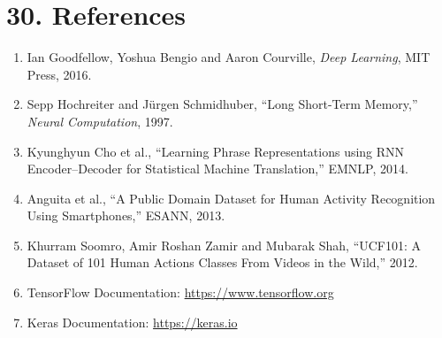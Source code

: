 \documentclass[10pt]{article}
\begin{document}
\section*{30. References}

\begin{enumerate}
\item Ian Goodfellow, Yoshua Bengio and Aaron Courville,
\emph{Deep Learning}, MIT Press, 2016.

\item Sepp Hochreiter and Jürgen Schmidhuber,
``Long Short-Term Memory,'' \emph{Neural Computation}, 1997.

\item Kyunghyun Cho et al.,
``Learning Phrase Representations using RNN Encoder--Decoder for Statistical
Machine Translation,'' EMNLP, 2014.

\item Anguita et al.,
``A Public Domain Dataset for Human Activity Recognition Using Smartphones,''
ESANN, 2013.

\item Khurram Soomro, Amir Roshan Zamir and Mubarak Shah,
``UCF101: A Dataset of 101 Human Actions Classes From Videos in the Wild,''
2012.

\item TensorFlow Documentation:
\url{https://www.tensorflow.org}

\item Keras Documentation:
\url{https://keras.io}
\end{enumerate}
\end{document}
